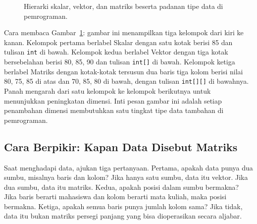 \documentclass[11pt,a4paper]{article}
\begin{document}
\begin{figure}[H]
	\centering
	\caption{Hierarki skalar, vektor, dan matriks beserta padanan tipe data di pemrograman.}
	\label{fig:hierarki}
\end{figure}

Cara membaca Gambar~\ref{fig:hierarki}: gambar ini menampilkan tiga kelompok dari kiri ke kanan. Kelompok pertama berlabel Skalar dengan satu kotak berisi 85 dan tulisan \texttt{int} di bawah. Kelompok kedua berlabel Vektor dengan tiga kotak bersebelahan berisi 80, 85, 90 dan tulisan \texttt{int[]} di bawah. Kelompok ketiga berlabel Matriks dengan kotak-kotak tersusun dua baris tiga kolom berisi nilai 80, 75, 85 di atas dan 70, 85, 80 di bawah, dengan tulisan \texttt{int[][]} di bawahnya. Panah mengarah dari satu kelompok ke kelompok berikutnya untuk menunjukkan peningkatan dimensi. Inti pesan gambar ini adalah setiap penambahan dimensi membutuhkan satu tingkat tipe data tambahan di pemrograman.

\subsection{Cara Berpikir: Kapan Data Disebut Matriks}

Saat menghadapi data, ajukan tiga pertanyaan. Pertama, apakah data punya dua sumbu, misalnya baris dan kolom? Jika hanya satu sumbu, data itu vektor. Jika dua sumbu, data itu matriks. Kedua, apakah posisi dalam sumbu bermakna? Jika baris berarti mahasiswa dan kolom berarti mata kuliah, maka posisi bermakna. Ketiga, apakah semua baris punya jumlah kolom sama? Jika tidak, data itu bukan matriks persegi panjang yang bisa dioperasikan secara aljabar.
\end{document}

